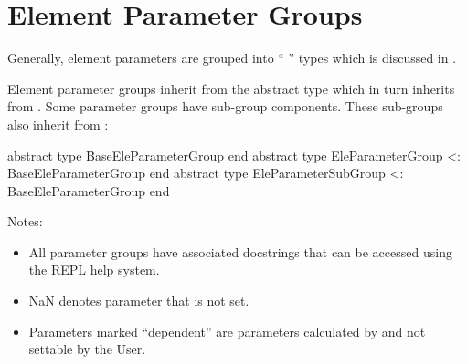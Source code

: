 \chapter{Element Parameter Groups}
\label{c:ele.groups}

Generally, element parameters are grouped into ``  '' 
types which is discussed in .

Element parameter groups inherit from the abstract type  which
in turn inherits from . Some
parameter groups have sub-group components. 
These sub-groups also inherit from :
\begin{example}
  abstract type BaseEleParameterGroup end
  abstract type EleParameterGroup <: BaseEleParameterGroup end
  abstract type EleParameterSubGroup <: BaseEleParameterGroup end
\end{example}

Notes:
\begin{itemize}
%
\item
All parameter groups have associated docstrings that can be accessed using the REPL help system.
%
\item
NaN denotes parameter that is not set.
%
\item
Parameters marked ``dependent'' are parameters calculated by \accellat and not settable by the User.
%
\end{itemize}


